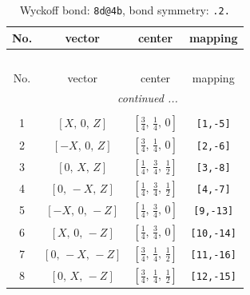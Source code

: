\documentclass[fleqn,8pt]{jsarticle}
\begin{document}
\begin{longtable}{cccc}
\caption{Wyckoff bond: {\tt 8d@4b}, bond symmetry: {\tt .2.}}
 \\
 \hline \hline
No. & vector & center & mapping \\ \hline \endfirsthead

\multicolumn{3}{l}{\tablename\ \thetable{}} \\
 \hline \hline
No. & vector & center & mapping \\ \hline \endhead

 \hline \hline
\multicolumn{3}{r}{\footnotesize\it continued ...} \\ \endfoot

 \hline \hline
\multicolumn{3}{r}{} \\ \endlastfoot

1 & $\left[ X,\, 0,\, Z \right]$ & $\left[ \frac{3}{4},\, \frac{1}{4},\, 0 \right]$ & {\tt [1,-5]} \\ \hline
2 & $\left[ - X,\, 0,\, Z \right]$ & $\left[ \frac{3}{4},\, \frac{1}{4},\, 0 \right]$ & {\tt [2,-6]} \\ \hline
3 & $\left[ 0,\, X,\, Z \right]$ & $\left[ \frac{1}{4},\, \frac{3}{4},\, \frac{1}{2} \right]$ & {\tt [3,-8]} \\ \hline
4 & $\left[ 0,\, - X,\, Z \right]$ & $\left[ \frac{1}{4},\, \frac{3}{4},\, \frac{1}{2} \right]$ & {\tt [4,-7]} \\ \hline
5 & $\left[ - X,\, 0,\, - Z \right]$ & $\left[ \frac{1}{4},\, \frac{3}{4},\, 0 \right]$ & {\tt [9,-13]} \\ \hline
6 & $\left[ X,\, 0,\, - Z \right]$ & $\left[ \frac{1}{4},\, \frac{3}{4},\, 0 \right]$ & {\tt [10,-14]} \\ \hline
7 & $\left[ 0,\, - X,\, - Z \right]$ & $\left[ \frac{3}{4},\, \frac{1}{4},\, \frac{1}{2} \right]$ & {\tt [11,-16]} \\ \hline
8 & $\left[ 0,\, X,\, - Z \right]$ & $\left[ \frac{3}{4},\, \frac{1}{4},\, \frac{1}{2} \right]$ & {\tt [12,-15]} \\
\end{longtable}
\renewcommand{\arraystretch}{1.2}
\end{document}
